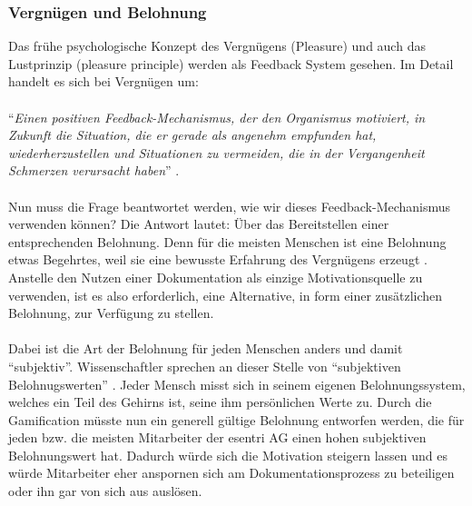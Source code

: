 \documentclass[a4paper,12pt,twoside]{scrartcl}
\begin{document}
\subsubsection{Vergnügen und Belohnung}
\label{Belohnung}
Das frühe psychologische Konzept des Vergnügens (Pleasure) und auch das Lustprinzip (pleasure principle) werden als Feedback System gesehen. Im Detail handelt es sich bei Vergnügen um:
\\\\
\enquote{\textit{Einen positiven Feedback-Mechanismus, der den Organismus motiviert, in Zukunft die Situation, die er gerade als angenehm empfunden hat, wiederherzustellen und Situationen zu vermeiden, die in der Vergangenheit Schmerzen verursacht haben}} \cite{Freud2015}.
\\\\
Nun muss die Frage beantwortet werden, wie wir dieses Feedback-Mechanismus verwenden können? Die Antwort lautet: Über das Bereitstellen einer entsprechenden Belohnung. Denn für die meisten Menschen ist eine Belohnung etwas Begehrtes, weil sie eine bewusste Erfahrung des Vergnügens erzeugt \cite{Berridge2009}. Anstelle den Nutzen einer Dokumentation als einzige Motivationsquelle zu verwenden, ist es also erforderlich, eine Alternative, in form einer zusätzlichen Belohnung, zur Verfügung zu stellen.
\\\\
Dabei ist die Art der Belohnung für jeden Menschen anders und damit \enquote{subjektiv}. Wissenschaftler sprechen an dieser Stelle von \enquote{subjektiven Belohnugswerten} \cite{Bonhoeffer2011}. Jeder Mensch misst sich in seinem eigenen Belohnungssystem, welches ein Teil des Gehirns ist, seine ihm persönlichen Werte zu. Durch die Gamification müsste nun ein generell gültige Belohnung entworfen werden, die für jeden bzw. die meisten Mitarbeiter der esentri AG einen hohen subjektiven Belohnungswert hat. Dadurch würde sich die Motivation steigern lassen und es würde Mitarbeiter eher anspornen sich am Dokumentationsprozess zu beteiligen oder ihn gar von sich aus auslösen.
\end{document}
